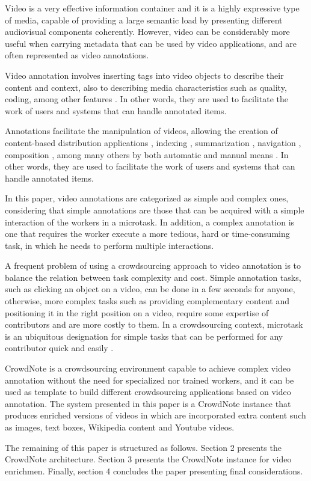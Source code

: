 Video is a very effective information container and it is a highly expressive type of media, capable of providing a large semantic load by presenting different audiovisual components coherently\cite{162960}. However, video can be considerably more useful when carrying metadata that can be used by video applications, and are often represented as video annotations.

Video annotation involves inserting tags into video objects to describe their content and context, also to describing media characteristics such as quality, coding, among other features \cite{Wang:2009:BDM:1652990.1653002}. In other words, they are used to facilitate the work of users and systems that can handle annotated items.

Annotations facilitate the manipulation of videos, allowing the creation of content-based distribution applications \cite{Zhang:2012:KIE:2339530.2339620}, indexing \cite{Zhang:2007:PRS:1290082.1290126}, summarization \cite{Fiao:2016:AGS:3001773.3001802}, navigation \cite{Goldman:2008}, composition \cite{Wilk:2015:VCC:2713168.2713178}, among many others by both automatic and manual means \cite{Wang:2011:ALM:1899412.1899414}. In other words, they are used to facilitate the work of users and systems that can handle annotated items.

In this paper, video annotations are categorized as simple and complex ones, considering that simple annotations are those that can be acquired with a simple interaction of the workers in a microtask. In addition, a complex annotation is one that requires the worker execute a more tedious, hard or time-consuming task, in which he needs to perform multiple interactions. 

A frequent problem of using a crowdsourcing approach to video annotation is to balance the relation between task complexity and cost. Simple annotation tasks, such as clicking an object on a video, can be done in a few seconds for anyone, otherwise, more complex tasks such as providing complementary content and positioning it in the right position on a video, require some expertise of contributors and are more costly to them. In a crowdsourcing context, microtask is an ubiquitous designation for simple tasks that can be performed for any contributor quick and easily \cite{Difallah:2015:DMC:2736277.2741685}.

CrowdNote is a crowdsourcing environment capable to achieve complex video annotation without the need for specialized nor trained workers, and it can be used as template to build different crowdsourcing applications based on video annotation. The system presented in this paper is a CrowdNote instance that produces enriched versions of videos in which are incorporated extra content such as images, text boxes, Wikipedia content and Youtube videos. 

The remaining of this paper is structured as follows. Section 2 presents the CrowdNote architecture. Section 3 presents the CrowdNote instance for video enrichmen. Finally, section 4 concludes the paper presenting final considerations.
